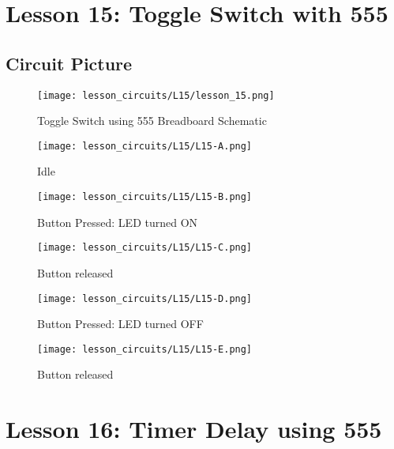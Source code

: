\section{Lesson 15: Toggle Switch with 555}
\subsection{Circuit Picture}
\begin{figure}[htp]
    \centering
    \texttt{[image: lesson\_circuits/L15/lesson\_15.png]}
    \caption{Toggle Switch using 555 Breadboard Schematic}
    \label{fig:555_ts_sch}
\end{figure}
\begin{figure}[htp]
    \centering
    \texttt{[image: lesson\_circuits/L15/L15-A.png]}
    \caption{Idle}
    \label{fig:555_ts_obb}
\end{figure}
\begin{figure}[htp]
    \centering
    \texttt{[image: lesson\_circuits/L15/L15-B.png]}
    \caption{Button Pressed: LED turned ON}
    \label{fig:555_ts_obb1}
\end{figure}
\begin{figure}[htp]
    \centering
    \texttt{[image: lesson\_circuits/L15/L15-C.png]}
    \caption{Button released}
    \label{fig:555_ts_obb2}
\end{figure}
\begin{figure}[htp]
    \centering
    \texttt{[image: lesson\_circuits/L15/L15-D.png]}
    \caption{Button Pressed: LED turned OFF}
    \label{fig:555_ts_obb3}
\end{figure}
\begin{figure}[htp]
    \centering
    \texttt{[image: lesson\_circuits/L15/L15-E.png]}
    \caption{Button released}
    \label{fig:555_ts_obb4}
\end{figure}
\section{Lesson 16: Timer Delay using 555}
